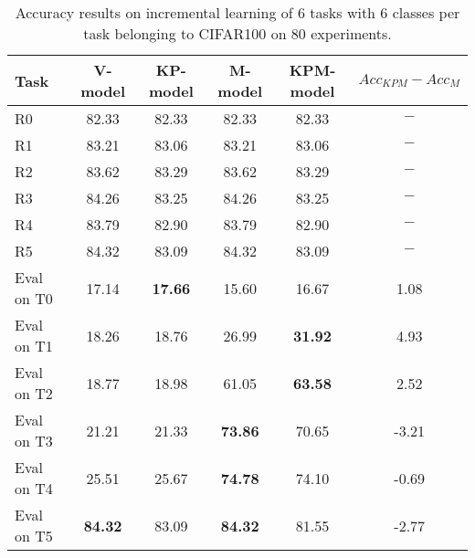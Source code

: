 \begin{table}[H]
\centering
\begin{tabular}{lccccc}
\toprule
Task  & V-model & KP-model & M-model & KPM-model & $Acc_{KPM}-Acc_{M}$ \\
\midrule
R0 & 82.33 & 82.33 & 82.33 & 82.33 & $-$ \\
R1 & 83.21 & 83.06 & 83.21 & 83.06 & $-$ \\
R2 & 83.62 & 83.29 & 83.62 & 83.29 & $-$ \\
R3 & 84.26 & 83.25 & 84.26 & 83.25 & $-$ \\
R4 & 83.79 & 82.90 & 83.79 & 82.90 & $-$ \\
R5 & 84.32 & 83.09 & 84.32 & 83.09 & $-$ \\

 \hline 
Eval on T0 & 17.14 & \textbf{17.66} & 15.60 & 16.67 & 1.08 \\
Eval on T1 & 18.26 & 18.76 & 26.99 & \textbf{31.92} & 4.93 \\
Eval on T2 & 18.77 & 18.98 & 61.05 & \textbf{63.58} & 2.52 \\
Eval on T3 & 21.21 & 21.33 & \textbf{73.86} & 70.65 & -3.21 \\
Eval on T4 & 25.51 & 25.67 & \textbf{74.78} & 74.10 & -0.69 \\
Eval on T5 & \textbf{84.32} & 83.09 & \textbf{84.32} & 81.55 & -2.77 \\
\bottomrule
\end{tabular}
\caption{Accuracy results on incremental learning of 6 tasks with 6 classes per task belonging to CIFAR100 on 80 experiments.}
\end{table}
